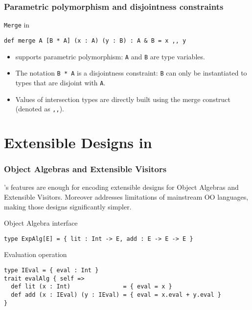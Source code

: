 \documentclass{beamer}
\begin{document}
\begin{frame}[fragile]
  \frametitle{Parametric polymorphism and disjointness constraints}

  \begin{exampleblock}{\lstinline{Merge} in \name}
\begin{lstlisting}
def merge A [B * A] (x : A) (y : B) : A & B = x ,, y
\end{lstlisting}

  \end{exampleblock}


  \begin{block}{}
    \begin{itemize}
    \item \name supports parametric polymorphism: \lstinline{A} and
      \lstinline{B} are type variables.
    \item The notation \lstinline{B * A} is a disjointness constraint:
      \lstinline{B} can only be instantiated to types that are disjoint with
      \lstinline{A}.
      \item Values of intersection types are directly built using the merge
        construct (denoted as \lstinline{,,}).
    \end{itemize}
  \end{block}

\end{frame}


\section{Extensible Designs in \name}

\begin{frame}[fragile]
  \frametitle{Object Algebras and Extensible Visitors}

\name's features are enough for encoding extensible designs for Object Algebras
and Extensible Visitors. Moreover \name addresses limitations of mainstream OO
languages, making those designs significantly simpler.

\pause

\begin{exampleblock}{Object Algebra interface}
\begin{lstlisting}
type ExpAlg[E] = { lit : Int -> E, add : E -> E -> E }
\end{lstlisting}
\end{exampleblock}

\pause

\begin{exampleblock}{Evaluation operation}
\begin{lstlisting}
type IEval = { eval : Int }
trait evalAlg { self =>
  def lit (x : Int)               = { eval = x }
  def add (x : IEval) (y : IEval) = { eval = x.eval + y.eval }
}
\end{lstlisting}
\end{exampleblock}

\end{frame}
\end{document}
